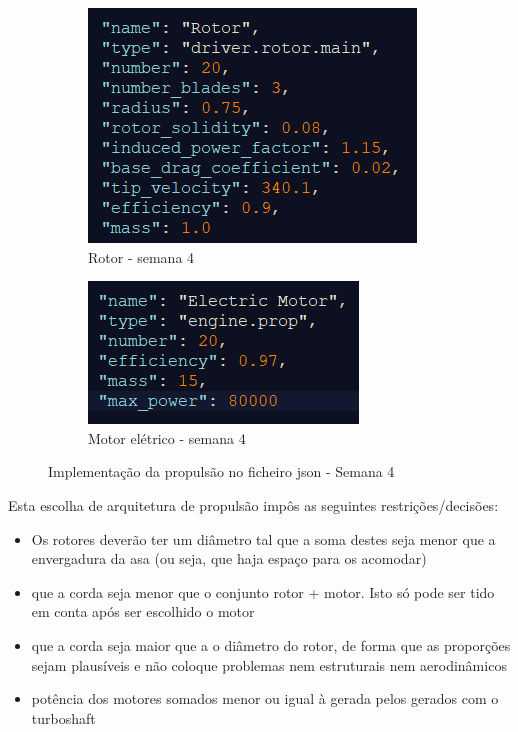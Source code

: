 \begin{figure}[h]
    \centering
    \begin{subfigure}[h]{0.33\textwidth}
        \includegraphics[width=\textwidth]{Imagens/rotor semana 4.PNG}
        \caption{Rotor - semana 4}
        \label{}
    \end{subfigure}
    \hfill
    \begin{subfigure}[h]{0.33\textwidth}
        \includegraphics[width=\textwidth]{Imagens/motor semana 4.PNG}
        \caption{Motor elétrico - semana 4}
        \label{}
    \end{subfigure}
    \caption{Implementação da propulsão no ficheiro json - Semana 4}
    \label{propulsoasemana4json}
\end{figure}
\FloatBarrier
Esta escolha de arquitetura de propulsão impôs as seguintes restrições/decisões:
\begin{itemize}
    \item Os rotores deverão ter um diâmetro tal que a soma destes seja menor que a envergadura da asa (ou seja, que haja espaço para os acomodar)
    \item que a corda seja menor que o conjunto rotor + motor. Isto só pode ser tido em conta após ser escolhido o motor
    \item que a corda seja maior que a o diâmetro do rotor, de forma que as proporções sejam plausíveis e não coloque problemas nem estruturais nem aerodinâmicos
    \item potência dos motores somados menor ou igual à gerada pelos gerados com o turboshaft
\end{itemize}

